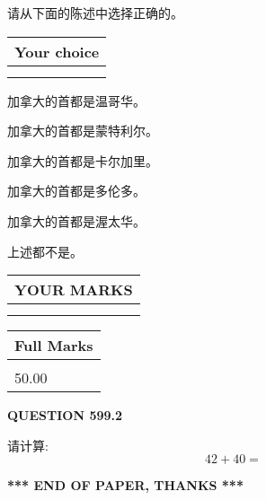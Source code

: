 \documentclass{ctexart}
\begin{document}
  
请从下面的陈述中选择正确的。
  
  
\noindent\hspace{3.0in} \begin{tabular}{|l|}
\hline
Your choice \\
\hline
 \\ 
 \\ 
\hline
\end{tabular}
  
  
 
 
加拿大的首都是温哥华。
 
 
加拿大的首都是蒙特利尔。
 
 
加拿大的首都是卡尔加里。
 
 
加拿大的首都是多伦多。
 
 
加拿大的首都是渥太华。
 
 
 上述都不是。
 
 
  
\vspace{0.2in}
  
\noindent\begin{tabular}{|l|}
\hline
 YOUR MARKS  \\
\hline
 \\ 
 \\ 
\hline
\end{tabular}
\hspace{0.05in} \begin{tabular}{|l|}
\hline
 Full Marks  \\
\hline
 \\ 
50.00 \\
\hline
\end{tabular}
{\textbf{\Large{QUESTION
599.2 
}}}
  
  
 
请计算:
\begin{equation}
42 +  %
40 = \nonumber
\end{equation}
 

 

 
   
   
 \vspace{0.2in}
 
   
   
   
   
\vspace{1.0in} 
{\textbf{\large{ *** END OF PAPER, THANKS *** }}} 
   
\end{document}
